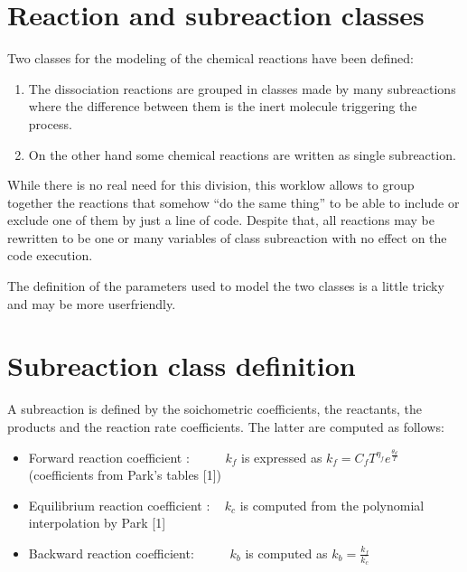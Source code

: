 \documentclass[letterpaper,10pt,english]{jupyterBook}
\begin{document}
\chapter{Reaction and sub\sphinxhyphen{}reaction classes}
\label{\detokenize{1_Temperature/Reaction_class_definition:reaction-and-sub-reaction-classes}}\label{\detokenize{1_Temperature/Reaction_class_definition::doc}}
\sphinxAtStartPar
Two classes for the modeling of the chemical reactions have been defined:
\begin{enumerate}
%
\item {} 
\sphinxAtStartPar
The dissociation reactions are grouped in classes made by many sub\sphinxhyphen{}reactions where the difference between them is the inert molecule triggering the process.

\item {} 
\sphinxAtStartPar
On the other hand some chemical reactions are written as single sub\sphinxhyphen{}reaction.

\end{enumerate}

\sphinxAtStartPar
While there is no real need for this division, this worklow allows to group together the reactions that somehow “do the same thing” to be able to include or exclude one of them by just a line of code. Despite that, all reactions may be re\sphinxhyphen{}written to be one or many variables of class sub\sphinxhyphen{}reaction with no effect on the code execution.

\sphinxAtStartPar
The definition of the parameters used to model the two classes is a little tricky and may be more user\sphinxhyphen{}friendly.


\chapter{Sub\sphinxhyphen{}reaction class definition}
\label{\detokenize{1_Temperature/Reaction_class_definition:sub-reaction-class-definition}}
\sphinxAtStartPar
A subreaction is defined by the soichometric coefficients, the reactants, the products and the reaction rate coefficients. The latter are computed as follows:
\begin{itemize}
\item {} 
\sphinxAtStartPar
Forward reaction coefficient :       \(k_f\) is expressed as \(k_f = C_f T ^{\eta_f}e^{\frac{\theta_d}{T}}\) (coefficients from Park’s tables {[}1{]})

\item {} 
\sphinxAtStartPar
Equilibrium reaction coefficient :   \(k_c\) is computed from the polynomial interpolation by Park {[}1{]}

\item {} 
\sphinxAtStartPar
Backward reaction coefficient:       \(k_b\) is computed as \(k_b = \frac{k_f}{k_c}\)

\end{itemize}
\end{document}
